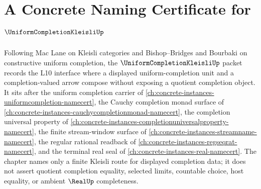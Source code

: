 \chapter{A Concrete Naming Certificate for $\UniformCompletionKleisliUp$}
\label{ch:concrete-instances-uniform-completion-kleisli-namecert}

Following Mac Lane on Kleisli categories and Bishop--Bridges and Bourbaki on constructive uniform completion, the $\UniformCompletionKleisliUp$ packet records the L10 interface where a displayed uniform-completion unit and a completion-valued arrow compose without exposing a quotient completion object. It sits after the uniform completion carrier of \autoref{ch:concrete-instances-uniformcompletion-namecert}, the Cauchy completion monad surface of \autoref{ch:concrete-instances-cauchycompletionmonad-namecert}, the completion universal property of \autoref{ch:concrete-instances-completionuniversalproperty-namecert}, the finite stream-window surface of \autoref{ch:concrete-instances-streamname-namecert}, the regular rational readback of \autoref{ch:concrete-instances-regseqrat-namecert}, and the terminal real seal of \autoref{ch:concrete-instances-real-namecert}. The chapter names only a finite Kleisli route for displayed completion data; it does not assert quotient completion equality, selected limits, countable choice, host equality, or ambient $\RealUp$ completeness.

